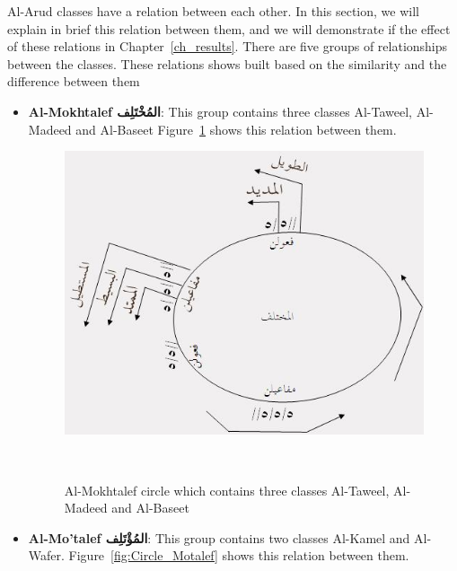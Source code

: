 Al-Arud classes have a relation between each other. In this section, we will explain in brief this relation between them, and we will demonstrate if the effect of these relations in Chapter~\ref{ch_results}. There are five groups of relationships between the classes. These relations shows built based on the similarity and the difference between them
  
  
  \begin{itemize}
  \item \textbf{Al-Mokhtalef \textarabic{المُخْتَلِف}}: This group contains three classes Al-Taweel, Al-Madeed and Al-Baseet Figure~\ref{fig:Circle_Mokhtalef} shows this relation between them.

    \begin{figure}[H]
 \includegraphics{./Figures/Ch_2_Background/Al-Mokhtalef.jpg}
 \caption{Al-Mokhtalef circle which contains three classes Al-Taweel, Al-Madeed and Al-Baseet}~\label{fig:Circle_Mokhtalef}
\end{figure}

\item \textbf{Al-Mo'talef \textarabic{المُؤْتَلِف}}: This group contains two classes Al-Kamel and Al-Wafer. Figure~\ref{fig:Circle_Motalef} shows this relation between them.


\end{itemize}
